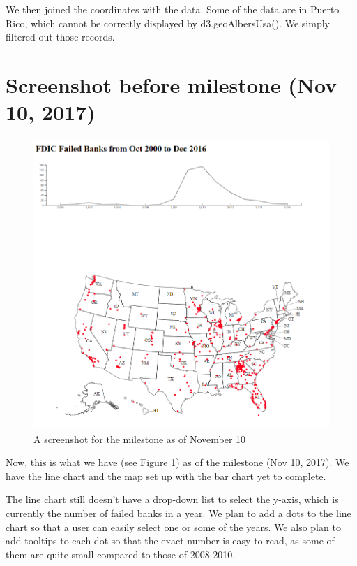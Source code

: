 We then joined the coordinates with the data. Some of the data are in Puerto
Rico, which cannot be correctly displayed by d3.geoAlbersUsa(). We simply
filtered out those records.

\newpage

\section{Screenshot before milestone (Nov 10, 2017)}

\begin{figure}[!h]
    \centering
    \includegraphics[width=\textwidth]{fig/Nov10}
    \caption{A screenshot for the milestone as of November 10}
    \label{fig:milestone}
\end{figure}

Now, this is what we have (see Figure \ref{fig:milestone}) as of the milestone
(Nov 10, 2017). We have the line chart and the map set up with the bar chart
yet to complete. 

The line chart still doesn't have a drop-down list to select
the y-axis, which is currently the number of failed banks in a year. We plan
to add a dots to the line chart so that a user can easily select one or some
of the years. We also plan to add tooltips to each dot so that the exact
number is easy to read, as some of them are quite small compared to those of
2008-2010.

